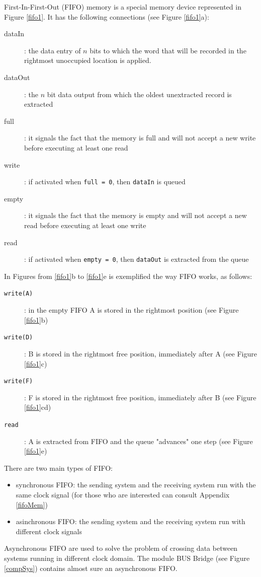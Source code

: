 First-In-First-Out (FIFO) memory is a special memory device represented in Figure \ref{fifo1}. It has the following connections (see Figure \ref{fifo1}a):
\begin{description}
    \item[dataIn]: the data entry of $n$ bits to which the word that will be recorded in the rightmost unoccupied location is applied.
    \item[dataOut]: the $n$ bit data output from which the oldest unextracted record is extracted
    \item[full]: it signals the fact that the memory is full and will not accept a new write before executing at least one read

    
    \item[write]: if activated when {\tt full = 0}, then {\tt dataIn} is queued
    \item[empty]: it signals the fact that the memory is empty and will not accept a new read before executing at least one write
    \item[read]: if activated when {\tt empty = 0}, then {\tt dataOut} is extracted from the  queue
\end{description}

In Figures from \ref{fifo1}b to \ref{fifo1}e is exemplified the way FIFO works, as follows:
\begin{description}
    \item[{\tt write(A)}]: in the empty FIFO A is stored in the rightmost position (see Figure \ref{fifo1}b)
    \item[{\tt write(D)}]: B is stored in the rightmost free position, immediately after A (see Figure \ref{fifo1}c)
    \item[{\tt write(F)}]: F is stored in the rightmost free position, immediately after B (see Figure \ref{fifo1}cd)
    \item[{\tt read}]: A is extracted from FIFO and the queue "advances" one step (see Figure \ref{fifo1}e)
\end{description}

There are two main types of FIFO:
\begin{itemize}
    \item synchronous FIFO: the sending system and the receiving system run with the same clock signal (for those who are interested can consult Appendix \ref{fifoMem})
    \item asinchronous FIFO: the sending system and the receiving system run with different  clock signals
\end{itemize}
Asynchronous FIFO are used to solve the problem of crossing data between systems running in different clock domain. The module BUS Bridge (see Figure \ref{compSys}) contains almost sure an asynchronous FIFO.


